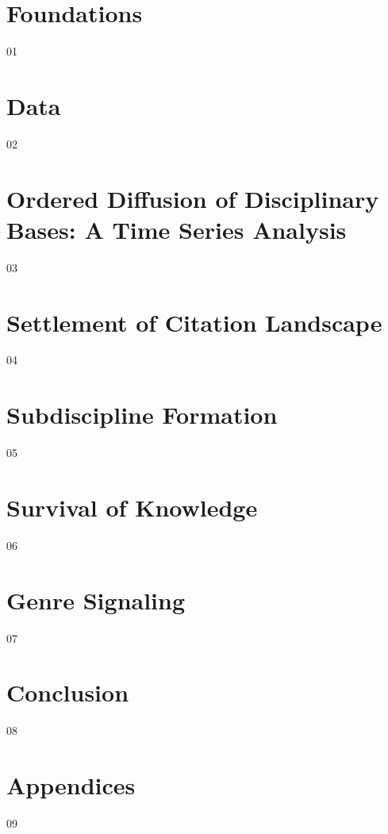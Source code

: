 \documentclass [PhD] {uclathes}
\begin{document}
\makeintropages

\chapter{Foundations}
 {01}
\chapter{Data}
 {02}
\chapter{Ordered Diffusion of Disciplinary Bases: A Time Series Analysis}
 {03}
\chapter{Settlement of Citation Landscape}
 {04}
\chapter{Subdiscipline Formation}
 {05}
\chapter{Survival of Knowledge}
 {06}
\chapter{Genre Signaling}
 {07}
\chapter{Conclusion}
 {08}
\chapter{Appendices}
 {09}


\thebibliography{}
\end{document}
